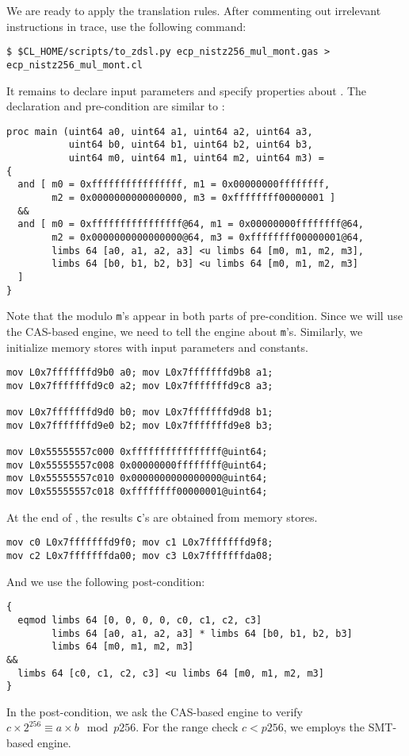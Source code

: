 \documentclass{amsproc}
\begin{document}
We are ready to apply the translation rules. After commenting out
irrelevant instructions in trace, use the following command:
\begin{verbatim}
$ $CL_HOME/scripts/to_zdsl.py ecp_nistz256_mul_mont.gas > ecp_nistz256_mul_mont.cl
\end{verbatim}

It remains to declare input parameters and specify properties about
\nistzmul. The declaration and pre-condition are similar to \nistzadd:
\begin{verbatim}
proc main (uint64 a0, uint64 a1, uint64 a2, uint64 a3,
           uint64 b0, uint64 b1, uint64 b2, uint64 b3,
           uint64 m0, uint64 m1, uint64 m2, uint64 m3) =
{
  and [ m0 = 0xffffffffffffffff, m1 = 0x00000000ffffffff,
        m2 = 0x0000000000000000, m3 = 0xffffffff00000001 ]
  &&
  and [ m0 = 0xffffffffffffffff@64, m1 = 0x00000000ffffffff@64,
        m2 = 0x0000000000000000@64, m3 = 0xffffffff00000001@64,
        limbs 64 [a0, a1, a2, a3] <u limbs 64 [m0, m1, m2, m3],
        limbs 64 [b0, b1, b2, b3] <u limbs 64 [m0, m1, m2, m3]
  ]
}
\end{verbatim}
Note that the modulo \texttt{m}'s appear in both parts of
pre-condition. Since we will use the CAS-based engine, we need to tell
the engine about \texttt{m}'s. Similarly, we initialize memory stores
with input parameters and constants.
\begin{verbatim}
mov L0x7fffffffd9b0 a0; mov L0x7fffffffd9b8 a1;
mov L0x7fffffffd9c0 a2; mov L0x7fffffffd9c8 a3;

mov L0x7fffffffd9d0 b0; mov L0x7fffffffd9d8 b1;
mov L0x7fffffffd9e0 b2; mov L0x7fffffffd9e8 b3;

mov L0x55555557c000 0xffffffffffffffff@uint64;
mov L0x55555557c008 0x00000000ffffffff@uint64;
mov L0x55555557c010 0x0000000000000000@uint64;
mov L0x55555557c018 0xffffffff00000001@uint64;
\end{verbatim}


At the end of \nistzmulcl, the results \texttt{c}'s are obtained from
memory stores.
\begin{verbatim}
mov c0 L0x7fffffffd9f0; mov c1 L0x7fffffffd9f8;
mov c2 L0x7fffffffda00; mov c3 L0x7fffffffda08;
\end{verbatim}
And we use the following post-condition:
\begin{verbatim}
{
  eqmod limbs 64 [0, 0, 0, 0, c0, c1, c2, c3]
        limbs 64 [a0, a1, a2, a3] * limbs 64 [b0, b1, b2, b3]
        limbs 64 [m0, m1, m2, m3]
&&
  limbs 64 [c0, c1, c2, c3] <u limbs 64 [m0, m1, m2, m3]
}
\end{verbatim}
In the post-condition, we ask the CAS-based engine to verify $c \times
2^{256} \equiv a \times b \mod p256$. For the range check $c < p256$,
we employs the SMT-based engine.
\end{document}
